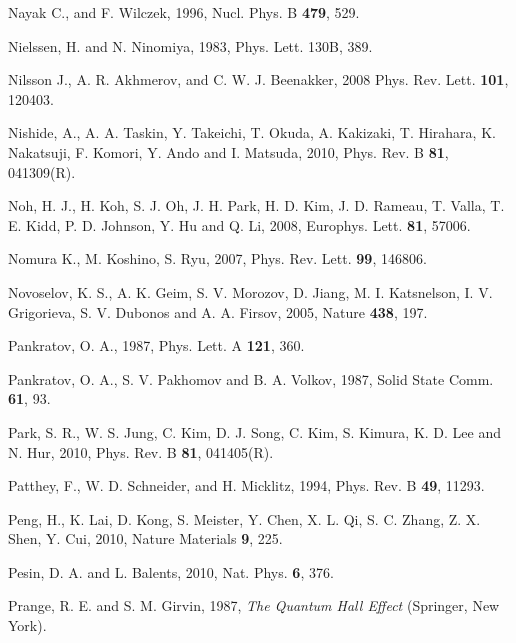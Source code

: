 \documentclass[twocolumn,floatfix,showpacs,rmp,aps]{revtex4}
\begin{document}
\begin{thebibliography}{99}
Nayak C., and F. Wilczek, 1996,
Nucl. Phys. B {\bf 479}, 529.

Nielssen, H. and N. Ninomiya, 1983,
Phys. Lett. 130B, 389.

Nilsson J., A. R. Akhmerov, and C. W. J. Beenakker, 2008
Phys. Rev. Lett. {\bf 101}, 120403.

Nishide, A., A. A. Taskin, Y. Takeichi, T. Okuda, A. Kakizaki, T. Hirahara,
K. Nakatsuji, F. Komori, Y. Ando and I. Matsuda, 2010,
Phys. Rev. B {\bf 81}, 041309(R).

Noh, H. J., H. Koh, S. J. Oh, J. H. Park, H. D. Kim, J. D. Rameau, T. Valla,
T. E. Kidd, P. D. Johnson, Y. Hu and Q. Li, 2008,
Europhys. Lett. {\bf 81}, 57006.

Nomura K., M. Koshino, S. Ryu, 2007,
Phys. Rev. Lett. {\bf 99}, 146806.

Novoselov, K. S., A. K. Geim, S. V. Morozov, D. Jiang, M. I. Katsnelson,
I. V. Grigorieva, S. V. Dubonos and A. A. Firsov, 2005,
Nature {\bf 438}, 197.

Pankratov, O. A., 1987,
Phys. Lett. A {\bf 121}, 360.

Pankratov, O. A., S. V. Pakhomov and B. A. Volkov, 1987,
Solid State Comm. {\bf 61}, 93.

Park, S. R., W. S. Jung, C. Kim, D. J. Song, C. Kim, S. Kimura, K. D. Lee and N. Hur, 2010,
Phys. Rev. B {\bf 81}, 041405(R).

Patthey, F., W. D. Schneider, and H. Micklitz, 1994,
Phys. Rev. B {\bf 49}, 11293.

Peng, H., K. Lai, D. Kong, S. Meister, Y. Chen, X. L. Qi, S. C. Zhang, Z. X. Shen, Y. Cui, 2010,
Nature Materials {\bf 9}, 225.

Pesin, D. A. and L. Balents, 2010,
Nat. Phys. {\bf 6}, 376.

Prange, R. E. and S. M. Girvin, 1987,
{\it The Quantum Hall Effect} (Springer, New York).


\end{thebibliography}
\end{document}
